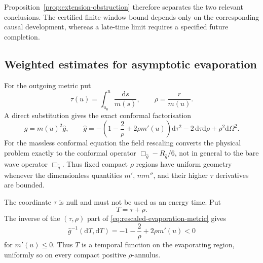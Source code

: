 \documentclass[11pt,a4paper]{article}
\theoremstyle{definition}
\theoremstyle{remark}
\newcommand{\dd}{\mathrm d}
\begin{document}
	Proposition~\ref{prop:extension-obstruction} therefore separates the two
	relevant conclusions.  The certified finite-window bound depends only on the
	corresponding causal development, whereas a late-time limit requires a
	specified future completion.
	
	\subsection{Weighted estimates for asymptotic evaporation}
	\label{sec:asymptotic-evaporation}
	
	For the outgoing metric put
	\begin{equation}
		\tau(u)=\int_{u_0}^{u}\frac{\dd s}{m(s)},
		\qquad \rho=\frac r{m(u)}.
		\label{eq:scaled-coordinates}
	\end{equation}
	A direct substitution gives the exact conformal factorisation
	\begin{equation}
		g=m(u)^2\widehat g,
		\qquad
		\widehat g=
		-\left(1-\frac2\rho+2\rho m'(u)\right)\dd\tau^2
		-2\,\dd\tau\dd\rho+\rho^2\dd\Omega^2.
		\label{eq:rescaled-evaporation-metric}
	\end{equation}
	For the massless conformal equation the field rescaling converts the physical
	problem exactly to the conformal operator
	$\Box_{\widehat g}-R_{\widehat g}/6$, not in general to the bare wave
	operator $\Box_{\widehat g}$.  Thus fixed compact
	$\rho$ regions have uniform geometry whenever the dimensionless quantities
	$m'$, $mm''$, and their higher $\tau$ derivatives are bounded.
	
	The coordinate $\tau$ is null and must not be used as an energy time.  Put
	\begin{equation}
		T=\tau+\rho.
		\label{eq:rescaled-temporal-time}
	\end{equation}
	The inverse of the $(\tau,\rho)$ part of \eqref{eq:rescaled-evaporation-metric}
	gives
	\begin{equation}
		\widehat g^{-1}(\dd T,\dd T)
		=-1-\frac2\rho+2\rho m'(u)<0
		\label{eq:rescaled-temporal-norm}
	\end{equation}
	for $m'(u)\leq0$.  Thus $T$ is a temporal function on the evaporating region,
	uniformly so on every compact positive $\rho$-annulus.
	
\end{document}
